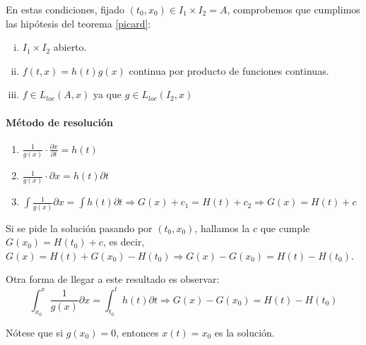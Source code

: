 \documentclass[11pt, a4paper,twoside]{article}
\theoremstyle{theorem-style}  %
\theoremstyle{definition-style}
\theoremstyle{example-style}
\begin{document}
En estas condiciones, fijado $ (t_0,x_0)\in I_1\times I_2=A $, comprobemos que cumplimos las hipótesis del teorema \ref{picard}:
\begin{enumerate}[i)]
	\item $ I_1\times I_2 $ abierto.
	\item $ f(t,x)=h(t)g(x) $ continua por producto de funciones continuas.
	\item $ f\in L_{loc} (A,x) $ ya que $ g\in L_{loc}(I_2,x) $
\end{enumerate}

\paragraph{Método de resolución}
\begin{enumerate}
	\item $ \frac{1}{g(x)}\cdot\frac{\partial x}{\partial t}=h(t) $
	\item $ \frac{1}{g(x)}\cdot\partial x=h(t)\partial t $
	\item $ \int \frac{1}{g(x)} \partial x= \int h(t) \partial t \Rightarrow G(x)+c_1=H(t)+c_2 \Rightarrow G(x)=H(t)+c$
\end{enumerate}
Si se pide la solución pasando por $ (t_0,x_0) $, hallamos la $ c $ que cumple $ G(x_0)=H(t_0)+c $, es decir, $ G(x)=H(t)+G(x_0)-H(t_0) \Rightarrow G(x)-G(x_0)=H(t)-H(t_0)$.

Otra forma de llegar a este resultado es observar:
\[ \int_{x_0}^{x} \frac{1}{g(x)} \partial x= \int_{t_0}^{t} h(t) \partial t \Rightarrow G(x)-G(x_0)=H(t)-H(t_0)\]

Nótese que si $ g(x_0)=0 $, entonces $ x(t)=x_0 $ es la solución.
\end{document}
